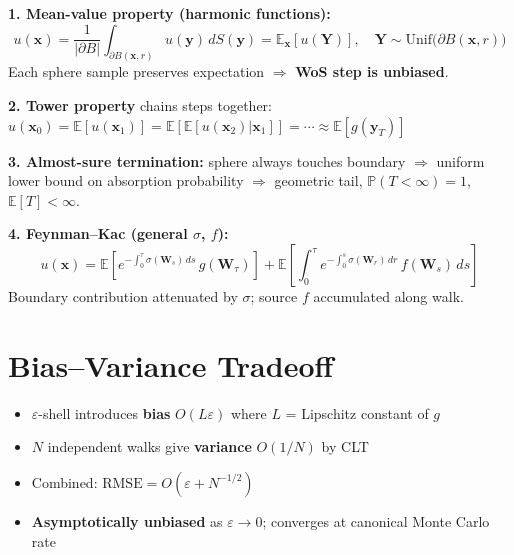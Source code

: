 \documentclass[11pt]{article}
\begin{document}
\begin{tcolorbox}[colback=lightbg,colframe=accent,boxrule=0.5pt,arc=2pt,left=6pt,right=6pt,top=4pt,bottom=4pt]
\textbf{1. Mean-value property (harmonic functions):}
\[
  u(\mathbf{x})
  = \frac{1}{|\partial B|}
    \int_{\partial B(\mathbf{x},r)} u(\mathbf{y})\,dS(\mathbf{y})
  = \mathbb{E}_{\mathbf{x}}[u(\mathbf{Y})],
  \quad \mathbf{Y} \sim \mathrm{Unif}\bigl(\partial B(\mathbf{x},r)\bigr)
\]
Each sphere sample preserves expectation $\Rightarrow$ \textbf{WoS step is unbiased}.

\textbf{2. Tower property} chains steps together:
$u(\mathbf{x}_0) = \mathbb{E}[u(\mathbf{x}_1)] = \mathbb{E}[\mathbb{E}[u(\mathbf{x}_2)|\mathbf{x}_1]] = \cdots \approx \mathbb{E}[g(\mathbf{y}_T)]$

\textbf{3. Almost-sure termination:} sphere always touches boundary $\Rightarrow$ uniform lower bound on absorption probability $\Rightarrow$ geometric tail, $\mathbb{P}(T < \infty) = 1$, $\mathbb{E}[T] < \infty$.

\textbf{4. Feynman--Kac (general $\sigma$, $f$):}
\[
  u(\mathbf{x})
  = \mathbb{E}\!\left[
    e^{-\int_0^\tau \sigma(\mathbf{W}_s)\,ds}\,g(\mathbf{W}_\tau)
  \right]
  + \mathbb{E}\!\left[
    \int_0^\tau\!
    e^{-\int_0^s \sigma(\mathbf{W}_r)\,dr}\,
    f(\mathbf{W}_s)\,ds
  \right]
\]
Boundary contribution attenuated by $\sigma$; source $f$ accumulated along walk.
\end{tcolorbox}

\section{Bias--Variance Tradeoff}

\begin{itemize}
  \item $\varepsilon$-shell introduces \textbf{bias} $O(L\varepsilon)$ where $L$ = Lipschitz constant of $g$
  \item $N$ independent walks give \textbf{variance} $O(1/N)$ by CLT
  \item Combined: $\mathrm{RMSE} = O(\varepsilon + N^{-1/2})$
  \item \textbf{Asymptotically unbiased} as $\varepsilon \to 0$; converges at canonical Monte Carlo rate
\end{itemize}

\end{document}

